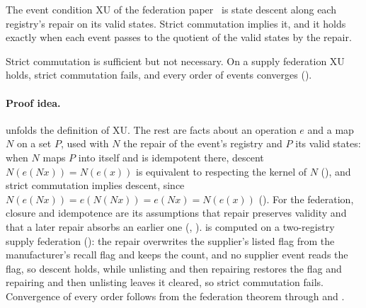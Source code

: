 \begin{theorem}\label{thm:ab}
The event condition XU of the federation paper~\cite{blackwell2026fed} is state descent along each registry's repair on its valid
states. Strict commutation implies it, and it holds exactly when each event passes to the quotient of
the valid states by the repair.
\end{theorem}

Strict commutation is sufficient but not necessary. On a supply federation XU holds, strict
commutation fails, and every order of events converges ().

\paragraph{Proof idea.}
 unfolds the definition of XU. The rest are facts about an operation $e$ and a map
$N$ on a set $P$, used with $N$ the repair of the event's registry and $P$ its valid states: when $N$
maps $P$ into itself and is idempotent there, descent $N(e(N x)) = N(e(x))$ is equivalent to
respecting the kernel of $N$ (), and strict commutation implies descent,
since $N(e(N x)) = e(N(N x)) = e(N x) = N(e(x))$ (). For the federation,
closure and idempotence are its assumptions that repair preserves validity and that a later
repair absorbs an earlier one (, ).  is computed on a two-registry supply federation
(): the repair overwrites the supplier's listed flag from the manufacturer's
recall flag and keeps the count, and no supplier event reads the flag, so descent holds, while unlisting and then
repairing restores the flag and repairing and then unlisting leaves it cleared, so strict commutation
fails. Convergence of every order follows from the federation theorem through
 and .
